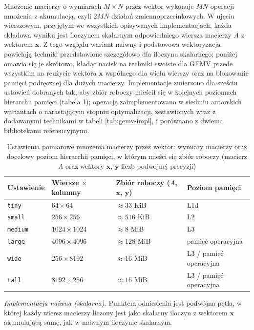 \documentclass[a4paper,12pt]{book} %
\begin{document}
Mnożenie macierzy o wymiarach $M \times N$ przez wektor wykonuje $M N$ operacji mnożenia z akumulacją, czyli $2 M N$ działań zmiennoprzecinkowych. W ujęciu wierszowym, przyjętym we wszystkich opisywanych implementacjach, każda składowa wyniku jest iloczynem skalarnym odpowiedniego wiersza macierzy $A$ z wektorem $\mathbf{x}$. Z tego względu wariant naiwny i podstawowa wektoryzacja powielają techniki przedstawione szczegółowo dla iloczynu skalarnego; poniżej omawia się je skrótowo, kładąc nacisk na techniki swoiste dla GEMV przede wszystkim na reużycie wektora $\mathbf{x}$ wspólnego dla wielu wierszy oraz na blokowanie pamięci podręcznej dla dużych macierzy. Implementacje zmierzono dla sześciu ustawień dobranych tak, aby zbiór roboczy mieścił się w kolejnych poziomach hierarchii pamięci (tabela \ref{tab:gemv-presety}); operację zaimplementowano w siedmiu autorskich wariantach o narastającym stopniu optymalizacji, zestawionych wraz z dodawanymi technikami w tabeli \ref{tab:gemv-impl}, i porównano z dwiema bibliotekami referencyjnymi.

\begin{table}[t!]
\centering
\caption{Ustawienia pomiarowe mnożenia macierzy przez wektor: wymiary macierzy oraz docelowy poziom hierarchii pamięci, w którym mieści się zbiór roboczy (macierz $A$ oraz wektory $\mathbf{x}$, $\mathbf{y}$ liczb podwójnej precyzji)}
\label{tab:gemv-presety}
\begin{tabular}{llll}
\hline
Ustawienie & Wiersze $\times$ kolumny & Zbiór roboczy ($A$, $\mathbf{x}$, $\mathbf{y}$) & Poziom pamięci \\
\hline
\texttt{tiny}   & $64 \times 64$     & $\approx 33$ KiB  & L1d \\
\texttt{small}  & $256 \times 256$   & $\approx 516$ KiB & L2 \\
\texttt{medium} & $1024 \times 1024$ & $\approx 8$ MiB   & L3 \\
\texttt{large}  & $4096 \times 4096$ & $\approx 128$ MiB & pamięć operacyjna \\
\texttt{wide}   & $256 \times 8192$  & $\approx 16$ MiB  & L3 / pamięć operacyjna \\
\texttt{tall}   & $8192 \times 256$  & $\approx 16$ MiB  & L3 / pamięć operacyjna \\
\hline
\end{tabular}
\end{table}

\emph{Implementacja naiwna (skalarna).} Punktem odniesienia jest podwójna pętla, w której każdy wiersz macierzy liczony jest jako skalarny iloczyn z wektorem $\mathbf{x}$ akumulującą sumę, jak w naiwnym iloczynie skalarnym.
\end{document}
